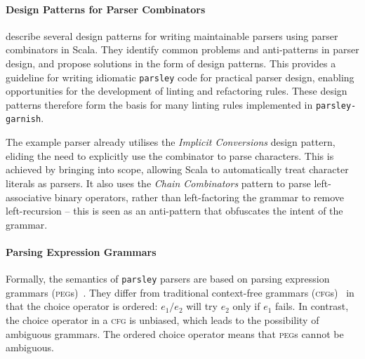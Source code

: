 \documentclass[../../main.tex]{subfiles}
\begin{document}
\paragraph{Design Patterns for Parser Combinators}
\textcite{willis_design_2022} describe several design patterns for writing maintainable parsers using parser combinators in Scala.
They identify common problems and anti-patterns in parser design, and propose solutions in the form of design patterns.
This provides a guideline for writing idiomatic \texttt{parsley} code for practical parser design, enabling opportunities for the development of linting and refactoring rules.
These design patterns therefore form the basis for many linting rules implemented in \texttt{parsley-garnish}.

The example parser already utilises the \emph{Implicit Conversions} design pattern, eliding the need to explicitly use the  combinator to parse characters.
This is achieved by bringing  into scope, allowing Scala to automatically treat character literals as  parsers.
It also uses the \emph{Chain Combinators} pattern to parse left-associative binary operators, rather than left-factoring the grammar to remove left-recursion -- this is seen as an anti-pattern that obfuscates the intent of the grammar.


\paragraph{Parsing Expression Grammars}
Formally, the semantics of \texttt{parsley} parsers are based on parsing expression grammars (\textsc{peg}s)~\cite{ford_peg_2004}.
They differ from traditional context-free grammars (\textsc{cfg}s)~\cite{mascarenhas_on_2014} in that the choice operator is ordered: $e_1 / e_2$ will try $e_2$ only if $e_1$ fails.
In contrast, the choice operator in a \textsc{cfg} is unbiased, which leads to the possibility of ambiguous grammars.
The ordered choice operator means that \textsc{peg}s cannot be ambiguous.
\end{document}
